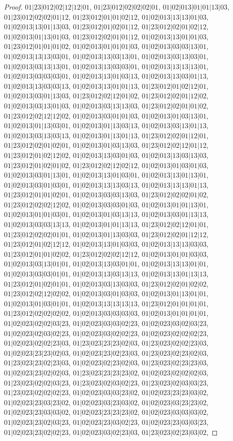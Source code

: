 \documentclass[12pt]{article}
\theoremstyle{plain}
\theoremstyle{definition}
\theoremstyle{remark}
\begin{document}
\begin{proof}
$01|23|012|02|12|12|01$, $01|23|012|02|02|02|01$, $01|02|013|01|01|13|03$, $01|23|012|02|02|01|12$, $01|23|012|01|01|02|12$, $01|02|013|13|13|01|03$, $01|02|013|13|01|13|03$, $01|23|012|01|02|01|12$, $01|23|012|02|01|02|12$, $01|02|013|01|13|01|03$, $01|23|012|02|01|01|12$, $01|02|013|13|01|01|03$, $01|23|012|01|01|01|02$, $01|02|013|01|01|01|03$, $01|02|013|03|03|13|01$, $01|02|013|13|13|03|01$, $01|02|013|13|03|13|01$, $01|02|013|03|13|03|01$, $01|02|013|03|13|13|01$, $01|02|013|13|03|03|01$, $01|02|013|13|13|13|01$, $01|02|013|03|03|03|01$, $01|02|013|13|01|03|13$, $01|02|013|13|03|01|13$, $01|02|013|13|03|03|13$, $01|02|013|13|01|01|13$, $01|23|012|01|02|12|01$, $01|02|013|03|01|13|03$, $01|23|012|02|12|01|02$, $01|23|012|02|01|12|02$, $01|02|013|03|13|01|03$, $01|02|013|03|13|13|03$, $01|23|012|02|01|01|02$, $01|23|012|02|12|12|02$, $01|02|013|03|01|01|03$, $01|02|013|01|03|13|01$, $01|02|013|01|13|03|01$, $01|02|013|01|13|03|13$, $01|02|013|03|13|01|13$, $01|02|013|03|13|03|13$, $01|02|013|01|13|01|13$, $01|23|012|02|01|12|01$, $01|23|012|02|01|02|01$, $01|02|013|01|03|13|03$, $01|23|012|02|12|01|12$, $01|23|012|01|02|12|02$, $01|02|013|13|03|01|03$, $01|02|013|13|03|13|03$, $01|23|012|01|02|01|02$, $01|23|012|02|12|02|12$, $01|02|013|01|03|01|03$, $01|02|013|03|01|13|01$, $01|02|013|13|01|03|01$, $01|02|013|13|01|13|01$, $01|02|013|03|01|03|01$, $01|02|013|13|13|03|13$, $01|02|013|13|13|01|13$, $01|23|012|01|01|02|01$, $01|02|013|03|03|13|03$, $01|23|012|02|02|01|02$, $01|23|012|02|02|12|02$, $01|02|013|03|03|01|03$, $01|02|013|01|01|13|01$, $01|02|013|01|01|03|01$, $01|02|013|01|03|13|13$, $01|02|013|03|01|13|13$, $01|02|013|03|03|13|13$, $01|02|013|01|01|13|13$, $01|23|012|02|12|01|01$, $01|23|012|02|02|01|01$, $01|02|013|01|13|03|03$, $01|23|012|02|01|12|12$, $01|23|012|01|02|12|12$, $01|02|013|13|01|03|03$, $01|02|013|13|13|03|03$, $01|23|012|01|01|02|02$, $01|23|012|02|02|12|12$, $01|02|013|01|01|03|03$, $01|02|013|03|13|01|01$, $01|02|013|13|03|01|01$, $01|02|013|13|13|01|01$, $01|02|013|03|03|01|01$, $01|02|013|13|03|13|13$, $01|02|013|13|01|13|13$, $01|23|012|01|02|01|01$, $01|02|013|03|13|03|03$, $01|23|012|02|01|02|02$, $01|23|012|02|12|02|02$, $01|02|013|03|01|03|03$, $01|02|013|01|13|01|01$, $01|02|013|01|03|01|01$, $01|02|013|13|13|13|13$, $01|23|012|01|01|01|01$, $01|23|012|02|02|02|02$, $01|02|013|03|03|03|03$, $01|02|013|01|01|01|01$, $01|02|023|02|02|03|23$, $01|02|023|03|03|02|23$, $01|02|023|03|02|03|23$, $01|02|023|02|03|02|23$, $01|02|023|03|02|02|23$, $01|02|023|02|02|02|23$, $01|02|023|02|02|23|03$, $01|23|023|23|23|02|03$, $01|23|023|02|02|23|03$, $01|02|023|23|23|02|03$, $01|02|023|23|02|23|03$, $01|23|023|02|23|02|03$, $01|23|023|23|02|23|03$, $01|02|023|02|23|02|03$, $01|23|023|02|23|23|03$, $01|02|023|23|02|02|03$, $01|23|023|23|23|23|02$, $01|02|023|02|02|02|03$, $01|23|023|02|02|03|23$, $01|23|023|02|03|02|23$, $01|23|023|02|03|03|23$, $01|23|023|02|02|02|23$, $01|02|023|03|03|23|02$, $01|02|023|23|23|03|02$, $01|02|023|23|03|23|02$, $01|02|023|03|23|03|02$, $01|02|023|03|23|23|02$, $01|02|023|23|03|03|02$, $01|02|023|23|23|23|02$, $01|02|023|03|03|03|02$, $01|02|023|23|02|03|23$, $01|02|023|23|03|02|23$, $01|02|023|23|03|03|23$, $01|02|023|23|02|02|23$, $01|02|023|03|02|23|03$, $01|23|023|02|23|03|02$, 
\end{proof}
\end{document}
